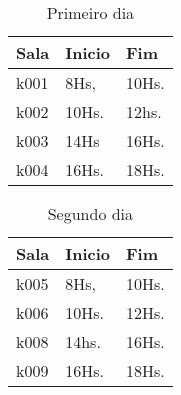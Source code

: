 \begin{table}[!h]
\centering
\caption{Primeiro dia}
\label{my-label}
\begin{tabular}{|l|l|l|}
\hline
\textbf{Sala}    &\textbf{Inicio}                     &\textbf{Fim}              \\ \hline
k001                     & 8Hs,                       & 10Hs.                    \\ \hline
k002                     & 10Hs.                      & 12hs.                    \\ \hline
k003                     & 14Hs                       & 16Hs.                    \\ \hline
k004                     & 16Hs.                      & 18Hs.                    \\ \hline
\end{tabular}
\end{table}
\begin{table}[!h]
\centering
\caption{Segundo dia}
\label{my-label}
\begin{tabular}{|l|l|l|}
\hline
\textbf{Sala}    &\textbf{Inicio}                     &\textbf{Fim}              \\ \hline						
k005                     & 8Hs,                       & 10Hs.                    \\ \hline
k006                     & 10Hs.                      & 12Hs.                    \\ \hline
k008                     & 14hs.                      & 16Hs.                    \\ \hline
k009                     & 16Hs.                      & 18Hs.                    \\ \hline
\end{tabular} 
\end{table}